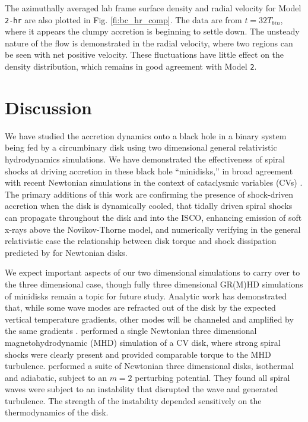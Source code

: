 \documentclass{emulateapj}
\newcommand{\model}[1]{{Model \texttt{#1}}}
\begin{document}
The azimuthally averaged lab frame surface density and radial velocity for \model{2-hr} are also plotted in Fig. \ref{fi:bc_hr_comp}.  The data are from $t = 32T_{bin}$, where it appears the clumpy accretion is beginning to settle down.  The unsteady nature of the flow is demonstrated in the radial velocity, where two regions can be seen with net positive velocity.  These fluctuations have little effect on the density distribution, which remains in good agreement with \model{2}.



\section{Discussion}
\label{sec:discussion}

We have studied the accretion dynamics onto a black hole in a binary system being fed by a circumbinary disk using two dimensional general relativistic hydrodynamics simulations. We have demonstrated the effectiveness of spiral shocks at driving accretion in these black hole ``minidisks,'' in broad agreement with recent Newtonian simulations in the context of cataclysmic variables (CVs) \citep{Ju16}.  The primary additions of this work are confirming the presence of shock-driven accretion when the disk is dynamically cooled, that tidally driven spiral shocks can propagate throughout the disk and into the ISCO, enhancing emission of soft x-rays above the Novikov-Thorne model, and numerically verifying in the general relativistic case the relationship between disk torque and shock dissipation predicted by \cite{Rafikov16} for Newtonian disks.

We expect important aspects of our two dimensional simulations to carry over to the three dimensional case, though fully three dimensional GR(M)HD simulations of minidisks remain a topic for future study.  Analytic work has demonstrated that, while some wave modes are refracted out of the disk by the expected vertical temperature gradients, other modes will be channeled and amplified by the same gradients \citep{Lubow98}. \cite{Ju16} performed a single Newtonian three dimensional magnetohydrodynamic (MHD) simulation of a CV disk, where strong spiral shocks were clearly present and provided comparable torque to the MHD turbulence.  \cite{Bae16} performed a suite of Newtonian three dimensional disks, isothermal and adiabatic, subject to an $m=2$ perturbing potential.  They found all spiral waves were subject to an instability that disrupted the wave and generated turbulence.  The strength of the instability depended sensitively on the thermodynamics of the disk.
\end{document}
